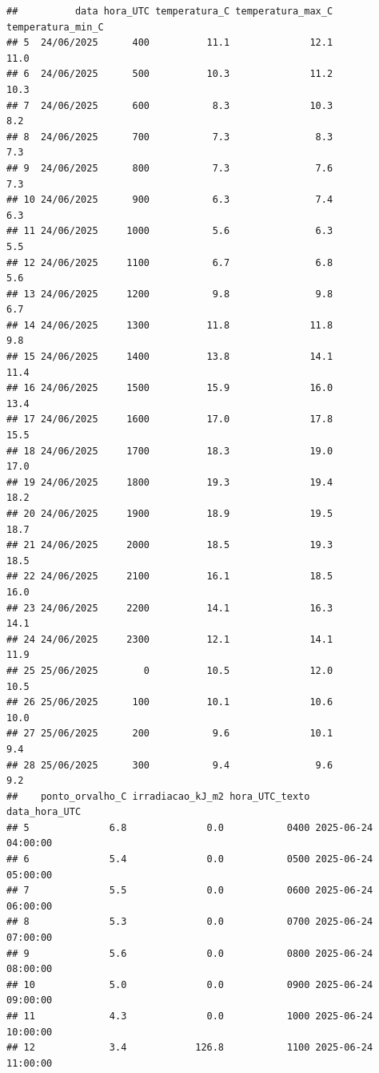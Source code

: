 \documentclass[
]{article}
\begin{document}
\begin{verbatim}
##          data hora_UTC temperatura_C temperatura_max_C temperatura_min_C
## 5  24/06/2025      400          11.1              12.1              11.0
## 6  24/06/2025      500          10.3              11.2              10.3
## 7  24/06/2025      600           8.3              10.3               8.2
## 8  24/06/2025      700           7.3               8.3               7.3
## 9  24/06/2025      800           7.3               7.6               7.3
## 10 24/06/2025      900           6.3               7.4               6.3
## 11 24/06/2025     1000           5.6               6.3               5.5
## 12 24/06/2025     1100           6.7               6.8               5.6
## 13 24/06/2025     1200           9.8               9.8               6.7
## 14 24/06/2025     1300          11.8              11.8               9.8
## 15 24/06/2025     1400          13.8              14.1              11.4
## 16 24/06/2025     1500          15.9              16.0              13.4
## 17 24/06/2025     1600          17.0              17.8              15.5
## 18 24/06/2025     1700          18.3              19.0              17.0
## 19 24/06/2025     1800          19.3              19.4              18.2
## 20 24/06/2025     1900          18.9              19.5              18.7
## 21 24/06/2025     2000          18.5              19.3              18.5
## 22 24/06/2025     2100          16.1              18.5              16.0
## 23 24/06/2025     2200          14.1              16.3              14.1
## 24 24/06/2025     2300          12.1              14.1              11.9
## 25 25/06/2025        0          10.5              12.0              10.5
## 26 25/06/2025      100          10.1              10.6              10.0
## 27 25/06/2025      200           9.6              10.1               9.4
## 28 25/06/2025      300           9.4               9.6               9.2
##    ponto_orvalho_C irradiacao_kJ_m2 hora_UTC_texto       data_hora_UTC
## 5              6.8              0.0           0400 2025-06-24 04:00:00
## 6              5.4              0.0           0500 2025-06-24 05:00:00
## 7              5.5              0.0           0600 2025-06-24 06:00:00
## 8              5.3              0.0           0700 2025-06-24 07:00:00
## 9              5.6              0.0           0800 2025-06-24 08:00:00
## 10             5.0              0.0           0900 2025-06-24 09:00:00
## 11             4.3              0.0           1000 2025-06-24 10:00:00
## 12             3.4            126.8           1100 2025-06-24 11:00:00

\end{verbatim}
\end{document}
